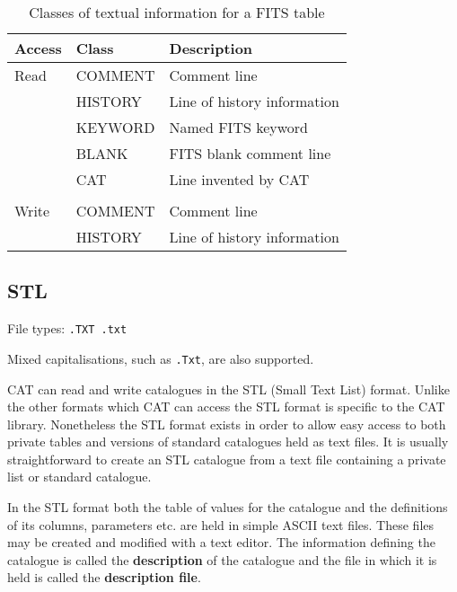\documentclass[11pt,twoside]{starlink}
\begin{document}
\begin{table}[htbp]

\begin{center}
\begin{tabular}{lll}
Access & Class    & Description   \\ \hline
Read   & COMMENT  & Comment line  \\
       & HISTORY  & Line of history information \\
       & KEYWORD  & Named FITS keyword  \\
       & BLANK    & FITS blank comment line  \\
       & CAT      & Line invented by CAT \\
       &          & \\
Write  & COMMENT  & Comment line  \\
       & HISTORY  & Line of history information \\
\end{tabular}
\end{center}

\caption{\label{FITS_TEXT}Classes of textual information for a FITS table}

\end{table}


\subsection{STL}

File types: \texttt{.TXT  .txt}

Mixed capitalisations, such as \texttt{.Txt}, are also supported.

CAT can read and write catalogues in the STL (Small Text List) format.
Unlike the other formats which CAT can access the STL format is specific
to the CAT library.  Nonetheless the STL format exists in order to allow
easy access to both private tables and versions of standard catalogues
held as text files.  It is usually straightforward to create an STL
catalogue from a text file containing a private list or standard catalogue.

In the STL format both the table of values for the catalogue and the
definitions of its columns, parameters etc. are held in simple ASCII
text files.  These files may be created and modified with a text editor.
The information defining the catalogue is called the \textbf{description} of
the catalogue and the file in which it is held is called the \textbf{description file}.
\end{document}

